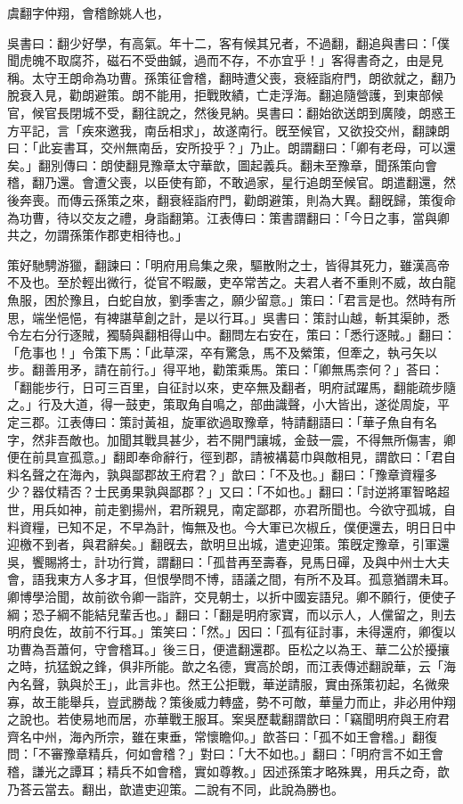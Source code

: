 
\begin{pinyinscope}
虞翻字仲翔，會稽餘姚人也，

吳書曰：翻少好學，有高氣。年十二，客有候其兄者，不過翻，翻追與書曰：「僕聞虎魄不取腐芥，磁石不受曲鍼，過而不存，不亦宜乎！」客得書奇之，由是見稱。太守王朗命為功曹。孫策征會稽，翻時遭父喪，衰絰詣府門，朗欲就之，翻乃脫衰入見，勸朗避策。朗不能用，拒戰敗績，亡走浮海。翻追隨營護，到東部候官，候官長閉城不受，翻往說之，然後見納。吳書曰：翻始欲送朗到廣陵，朗惑王方平記，言「疾來邀我，南岳相求」，故遂南行。旣至候官，又欲投交州，翻諫朗曰：「此妄書耳，交州無南岳，安所投乎？」乃止。朗謂翻曰：「卿有老母，可以還矣。」翻別傳曰：朗使翻見豫章太守華歆，圖起義兵。翻未至豫章，聞孫策向會稽，翻乃還。會遭父喪，以臣使有節，不敢過家，星行追朗至候官。朗遣翻還，然後奔喪。而傳云孫策之來，翻衰絰詣府門，勸朗避策，則為大異。翻旣歸，策復命為功曹，待以交友之禮，身詣翻第。江表傳曰：策書謂翻曰：「今日之事，當與卿共之，勿謂孫策作郡吏相待也。」

策好馳騁游獵，翻諫曰：「明府用烏集之衆，驅散附之士，皆得其死力，雖漢高帝不及也。至於輕出微行，從官不暇嚴，吏卒常苦之。夫君人者不重則不威，故白龍魚服，困於豫且，白蛇自放，劉季害之，願少留意。」策曰：「君言是也。然時有所思，端坐悒悒，有裨諶草創之計，是以行耳。」吳書曰：策討山越，斬其渠帥，悉令左右分行逐賊，獨騎與翻相得山中。翻問左右安在，策曰：「悉行逐賊。」翻曰：「危事也！」令策下馬：「此草深，卒有驚急，馬不及縈策，但牽之，執弓矢以步。翻善用矛，請在前行。」得平地，勸策乘馬。策曰：「卿無馬柰何？」荅曰：「翻能步行，日可三百里，自征討以來，吏卒無及翻者，明府試躍馬，翻能疏步隨之。」行及大道，得一鼓吏，策取角自鳴之，部曲識聲，小大皆出，遂從周旋，平定三郡。江表傳曰：策討黃祖，旋軍欲過取豫章，特請翻語曰：「華子魚自有名字，然非吾敵也。加聞其戰具甚少，若不開門讓城，金鼓一震，不得無所傷害，卿便在前具宣孤意。」翻即奉命辭行，徑到郡，請被褠葛巾與敵相見，謂歆曰：「君自料名聲之在海內，孰與鄙郡故王府君？」歆曰：「不及也。」翻曰：「豫章資糧多少？器仗精否？士民勇果孰與鄙郡？」又曰：「不如也。」翻曰：「討逆將軍智略超世，用兵如神，前走劉揚州，君所親見，南定鄙郡，亦君所聞也。今欲守孤城，自料資糧，已知不足，不早為計，悔無及也。今大軍已次椒丘，僕便還去，明日日中迎檄不到者，與君辭矣。」翻旣去，歆明旦出城，遣吏迎策。策旣定豫章，引軍還吳，饗賜將士，計功行賞，謂翻曰：「孤昔再至壽春，見馬日磾，及與中州士大夫會，語我東方人多才耳，但恨學問不博，語議之間，有所不及耳。孤意猶謂未耳。卿博學洽聞，故前欲令卿一詣許，交見朝士，以折中國妄語兒。卿不願行，便使子綱；恐子綱不能結兒輩舌也。」翻曰：「翻是明府家寶，而以示人，人儻留之，則去明府良佐，故前不行耳。」策笑曰：「然。」因曰：「孤有征討事，未得還府，卿復以功曹為吾蕭何，守會稽耳。」後三日，便遣翻還郡。臣松之以為王、華二公於擾攘之時，抗猛銳之鋒，俱非所能。歆之名德，實高於朗，而江表傳述翻說華，云「海內名聲，孰與於王」，此言非也。然王公拒戰，華逆請服，實由孫策初起，名微衆寡，故王能舉兵，豈武勝哉？策後威力轉盛，勢不可敵，華量力而止，非必用仲翔之說也。若使易地而居，亦華戰王服耳。案吳歷載翻謂歆曰：「竊聞明府與王府君齊名中州，海內所宗，雖在東垂，常懷瞻仰。」歆荅曰：「孤不如王會稽。」翻復問：「不審豫章精兵，何如會稽？」對曰：「大不如也。」翻曰：「明府言不如王會稽，謙光之譚耳；精兵不如會稽，實如尊教。」因述孫策才略殊異，用兵之奇，歆乃荅云當去。翻出，歆遣吏迎策。二說有不同，此說為勝也。


\end{pinyinscope}

